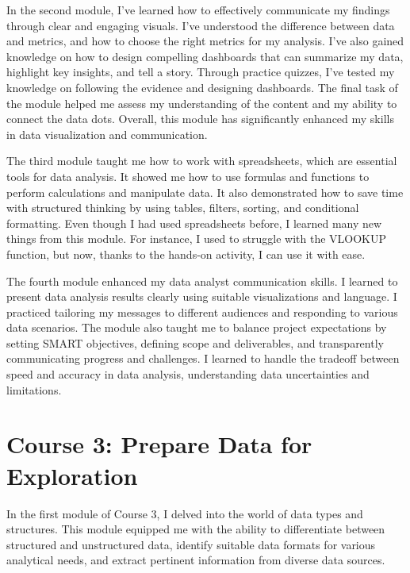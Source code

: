 \documentclass[]{article}
\begin{document}
In the second module, I've learned how to effectively communicate my findings through clear and engaging visuals. I've understood the difference between data and metrics, and how to choose the right metrics for my analysis. I've also gained knowledge on how to design compelling dashboards that can summarize my data, highlight key insights, and tell a story. Through practice quizzes, I've tested my knowledge on following the evidence and designing dashboards. The final task of the module helped me assess my understanding of the content and my ability to connect the data dots. Overall, this module has significantly enhanced my skills in data visualization and communication.\par

The third module taught me how to work with spreadsheets, which are essential tools for data analysis. It showed me how to use formulas and functions to perform calculations and manipulate data. It also demonstrated how to save time with structured thinking by using tables, filters, sorting, and conditional formatting. Even though I had used spreadsheets before, I learned many new things from this module. For instance, I used to struggle with the VLOOKUP function, but now, thanks to the hands-on activity, I can use it with ease.\par

The fourth module enhanced my data analyst communication skills. I learned to present data analysis results clearly using suitable visualizations and language. I practiced tailoring my messages to different audiences and responding to various data scenarios. The module also taught me to balance project expectations by setting SMART objectives, defining scope and deliverables, and transparently communicating progress and challenges. I learned to handle the tradeoff between speed and accuracy in data analysis, understanding data uncertainties and limitations.\par

\section{Course 3: Prepare Data for Exploration}

In the first module of Course 3, I delved into the world of data types and structures. This module equipped me with the ability to differentiate between structured and unstructured data, identify suitable data formats for various analytical needs, and extract pertinent information from diverse data sources.
\end{document}
